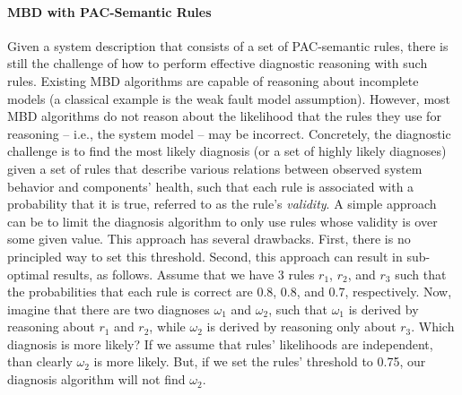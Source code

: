 \documentclass[12pt]{article}
\begin{document}
\paragraph{MBD with PAC-Semantic Rules}
Given a system description that consists of a set of PAC-semantic rules, there is still the challenge 
of how to perform effective diagnostic reasoning with such rules. 
Existing MBD algorithms are capable of reasoning about incomplete models (a classical example is the weak fault model assumption). However, most MBD algorithms do not reason about the likelihood that the rules they use for reasoning -- i.e., the system model -- may be incorrect. 
Concretely, the diagnostic challenge is to find the most likely diagnosis (or a set of highly likely diagnoses) given a set of rules that describe various relations between observed system behavior and components' health, such that each rule is associated with a probability that it is true, referred to as the rule's {\em validity}. 
A simple approach can be to limit the diagnosis algorithm to only use rules whose validity is over some given value. This approach has several drawbacks. First, there is no principled way to set this threshold. Second, this approach can result in sub-optimal results, as follows. 
Assume that we have 3 rules $r_1$, $r_2$, and $r_3$ such that the probabilities that each rule is correct are 0.8, 0.8, and 0.7, respectively. 
Now, imagine that there are two diagnoses $\omega_1$ and $\omega_2$, such that $\omega_1$ is derived by reasoning about $r_1$ and $r_2$, while $\omega_2$ is derived by reasoning only about $r_3$. Which diagnosis is more likely? 
If we assume that rules' likelihoods are independent, than clearly $\omega_2$ is more likely. But, if we set the rules' threshold to 0.75, our diagnosis algorithm will not find $\omega_2$. 
\end{document}
